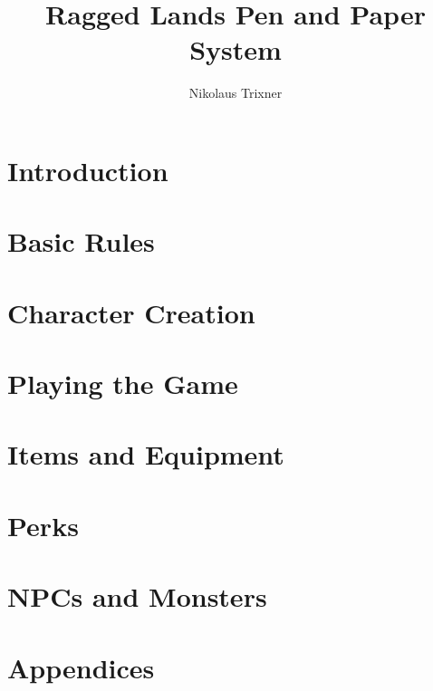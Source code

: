\documentclass{book}
\begin{document}
	
	\title{Ragged Lands Pen and Paper System}
	\author{Nikolaus Trixner}
		
	\maketitle
	\tableofcontents

\part{Introduction}
	
	

\part{Basic Rules}
	

\part{Character Creation}
	
	
	
	
	

\part{Playing the Game}
	
	
	
	

\part{Items and Equipment}
	
	
	

\part{Perks}
	
	
	
	
	
	

\part{NPCs and Monsters}
	

\part{Appendices}
\begin{appendices}

	
	
	

\end{appendices}
\end{document}

